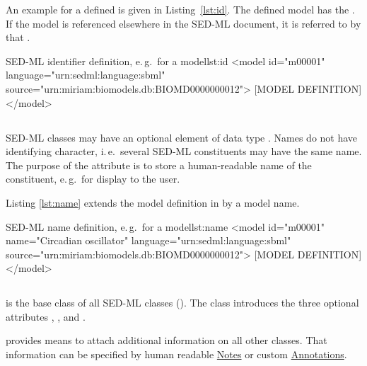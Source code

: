 An example for a defined  is given in Listing~\ref{lst:id}. The defined model has the  . If the model is referenced elsewhere in the SED-ML document, it is referred to by that .

\begin{myXmlLst}{SED-ML identifier definition, e.\,g.\ for a model}{lst:id}
<model id="m00001" language="urn:sedml:language:sbml" source="urn:miriam:biomodels.db:BIOMD0000000012">
	[MODEL DEFINITION]
</model>
\end{myXmlLst}

\subsection{}
\label{sec:name}
SED-ML classes may have an optional element  of data type . Names do not have identifying character, i.\,e.\ several SED-ML constituents may have the same name. The purpose of the  attribute is to store a human-readable name of the constituent, e.\,g.\ for display to the user.

Listing \ref{lst:name} extends the model definition in  by a model name.

\begin{myXmlLst}{SED-ML name definition, e.\,g.\ for a model}{lst:name}
<model id="m00001" name="Circadian oscillator" language="urn:sedml:language:sbml" source="urn:miriam:biomodels.db:BIOMD0000000012">
	[MODEL DEFINITION]
</model>
\end{myXmlLst}


\subsection{}
\label{class:sedBase}
 is the base class of all SED-ML classes (). The  class introduces the three optional attributes \hyperref[sec:metaid]{}, \hyperref[class:notes]{}, and \hyperref[class:annotation]{}. 

 provides means to attach additional information on all other classes. That information can be specified by human readable \hyperref[class:notes]{Notes} or custom \hyperref[class:annotation]{Annotations}.

